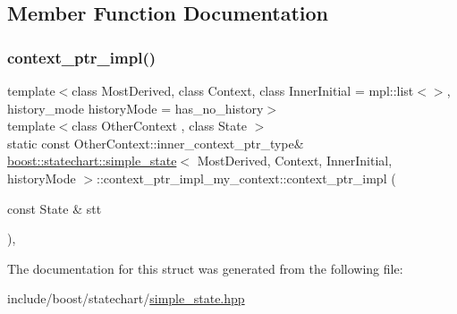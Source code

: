 \subsection{Member Function Documentation}
\mbox{\label{structboost_1_1statechart_1_1simple__state_1_1context__ptr__impl__my__context_aaa2140e2cefe3d97066e8cf11d321090}} 
\subsubsection{\texorpdfstring{context\+\_\+ptr\+\_\+impl()}{context\_ptr\_impl()}}
{\footnotesize\ttfamily template$<$class Most\+Derived, class Context, class Inner\+Initial = mpl\+::list$<$$>$, history\+\_\+mode history\+Mode = has\+\_\+no\+\_\+history$>$ \\
template$<$class Other\+Context , class State $>$ \\
static const Other\+Context\+::inner\+\_\+context\+\_\+ptr\+\_\+type\& \mbox{\hyperlink{classboost_1_1statechart_1_1simple__state}{boost\+::statechart\+::simple\+\_\+state}}$<$ Most\+Derived, Context, Inner\+Initial, history\+Mode $>$\+::context\+\_\+ptr\+\_\+impl\+\_\+my\+\_\+context\+::context\+\_\+ptr\+\_\+impl (\begin{DoxyParamCaption}\item[{const State \&}]{stt }\end{DoxyParamCaption})\hspace{0.3cm}{\ttfamily [inline]}, {\ttfamily [static]}}



The documentation for this struct was generated from the following file\+:\begin{DoxyCompactItemize}
\item 
include/boost/statechart/\mbox{\hyperlink{simple__state_8hpp}{simple\+\_\+state.\+hpp}}\end{DoxyCompactItemize}
